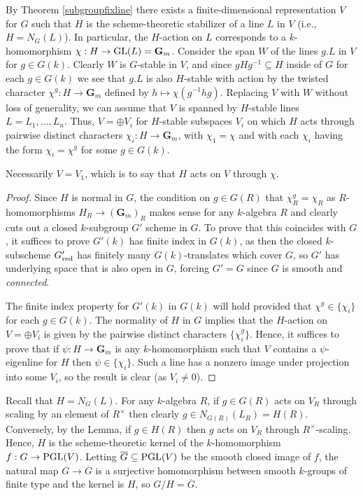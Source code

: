 \documentclass[10pt]{article}
\renewcommand{\(}{\left(}
\renewcommand{\)}{\right)}
\numberwithin{thm}{subsection}
\begin{document}
By Theorem \ref{subgroupfixline} there exists a finite-dimensional
representation $V$ for $G$ such that $H$ is the scheme-theoretic stabilizer of a line
$L$ in $V$ (i.e., $H = N_G(L)$).  In particular, 
the $H$-action on $L$ corresponds to a $k$-homomorphism
$\chi:H \rightarrow {\rm{GL}}(L) = \mathbf{G}_m$. 
Consider the span $W$ of the lines $g.L$ in $V$ for $g \in G(k)$.  Clearly
$W$ is $G$-stable in $V$, and since $gHg^{-1} \subseteq H$ inside of $G$
for each $g \in G(k)$ we see that $g.L$ is also $H$-stable
with action by the twisted character $\chi^g:H \rightarrow \mathbf{G}_m$
defined by $h \mapsto \chi(g^{-1}hg)$.  Replacing $V$ with $W$
without loss of generality, we can assume that $V$ is spanned by $H$-stable lines
$L = L_1, \dots, L_n$.  Thus, $V = \oplus V_i$ for $H$-stable 
subspaces $V_i$ on which $H$ acts through pairwise distinct characters $\chi_i:H \rightarrow
\mathbf{G}_m$, with $\chi_1 = \chi$ and with each $\chi_i$ having the form $\chi_i = \chi^g$
for some $g \in G(k)$. 

\begin{lemma} Necessarily $V = V_1$, which is to say that $H$ acts on $V$ through $\chi$.
\end{lemma}

\begin{proof}
Since $H$ is normal in $G$, the condition on $g \in G(R)$ that $\chi_R^g = \chi_R$
as $R$-homomorphisms $H_R \rightarrow (\mathbf{G}_m)_R$ makes sense
for any $k$-algebra $R$ and clearly cuts out a closed $k$-subgroup $G'$ scheme in $G$.
To prove that this coincides with $G$, it suffices to prove $G'(k)$ has finite index in
$G(k)$, as then the closed $k$-subscheme $G'_{\rm{red}}$ has finitely
many $G(k)$-translates which cover $G$, so $G'$ has underlying space
that is also open in $G$, forcing $G' = G$ since $G$ is smooth and {\em connected}. 

The finite index property for $G'(k)$ in $G(k)$ will hold provided that
$\chi^g \in \{\chi_i\}$ for each $g \in G(k)$.   The normality of $H$ in $G$ implies
that the $H$-action on $V = \oplus V_i$ is given by the pairwise distinct
characters $\{\chi_i^g\}$.  Hence, it suffices to prove that if
$\psi:H \rightarrow \mathbf{G}_m$ is any $k$-homomorphism such
that $V$ contains a $\psi$-eigenline for $H$ then $\psi \in \{\chi_i\}$.
Such a line has a nonzero image under projection into some $V_i$, so
the result is clear (as $V_i \ne 0$). 
\end{proof}

Recall that $H = N_G(L)$.   For any $k$-algebra $R$, if
$g \in G(R)$ acts on $V_R$ through scaling by an element of $R^{\times}$
then clearly $g \in N_{G(R)}(L_R) = H(R)$.  Conversely, by the Lemma, if
$g \in H(R)$ then $g$ acts on $V_R$ through $R^{\times}$-scaling.
Hence, $H$ is the scheme-theoretic kernel of
the $k$-homomorphism $f:G \rightarrow {\rm{PGL}}(V)$.
Letting $\overline{G} \subseteq {\rm{PGL}}(V)$ be the smooth closed
image of $f$, the natural map
$G \rightarrow \overline{G}$ is a surjective homomorphism between
smooth $k$-groups of finite type and the kernel is $H$, so $G/H = \overline{G}$.
\end{document}
